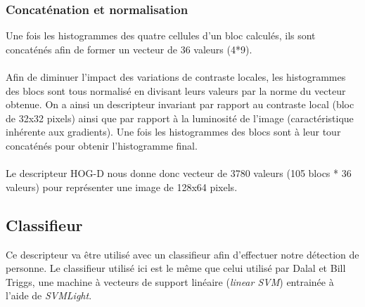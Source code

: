 \documentclass[12pt]{article}
\begin{document}
\subsubsection{Concaténation et normalisation}
Une fois les histogrammes des quatre cellules d'un bloc calculés, ils sont concaténés afin de former un vecteur de 36 valeurs (4*9).\\
\\
Afin de diminuer l'impact des variations de contraste locales, les histogrammes des blocs sont tous normalisé en divisant leurs valeurs par la norme du vecteur obtenue. On a ainsi un descripteur invariant par rapport au contraste local (bloc de 32x32 pixels) ainsi que par rapport à la luminosité de l'image (caractéristique inhérente aux gradients).
Une fois les histogrammes des blocs sont à leur tour concaténés pour obtenir l'histogramme final.\\
\\
Le descripteur HOG-D nous donne donc vecteur de 3780 valeurs (105 blocs * 36 valeurs) pour représenter une image de 128x64 pixels.

\subsection{Classifieur}
Ce descripteur va être utilisé avec un classifieur afin d'effectuer notre détection de personne. Le classifieur utilisé ici est le même que celui utilisé par Dalal et Bill Triggs, une machine à vecteurs de support linéaire (\textit{linear SVM}) entrainée à l'aide de \textit{SVMLight}.\\
\\
\end{document}
